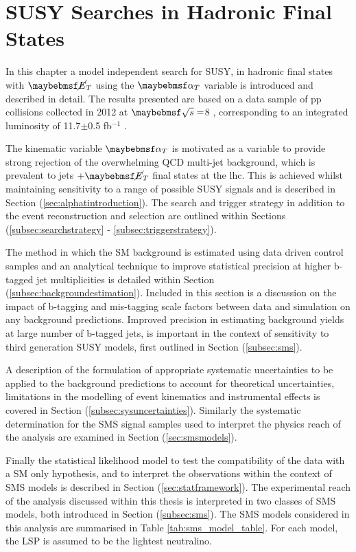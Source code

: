 \chapter{SUSY Searches in Hadronic Final States}
\label{chap:SUSYsearches}

In this chapter a model independent search for \ac{SUSY}, in hadronic final states with $\met$ using the $\alphat$ variable is introduced and described in detail. The results presented are based on a data sample of pp collisions collected in 2012 at $\com =$8 \TeV, corresponding to an integrated luminosity of 11.7$\pm$0.5 fb$^{-1}$ \cite{ra1_epjc}.

The kinematic variable $\alphat$ is motivated as a variable to provide strong rejection of the overwhelming QCD multi-jet background, which is prevalent to jets $+ \met$ final states at the \ac{lhc}. This is achieved whilst maintaining sensitivity to a range of possible \ac{SUSY} signals and is described in Section (\ref{sec:alphatintroduction}). The search and trigger strategy in addition to the event reconstruction and selection are outlined within Sections (\ref{subsec:searchstrategy} - \ref{subsec:triggerstrategy}). 

The method in which the \ac{SM} background is estimated using data driven control samples and an analytical technique to improve statistical precision at higher b-tagged jet multiplicities is detailed within Section (\ref{subsec:backgroundestimation}). Included in this section is a discussion on the impact of b-tagging and mis-tagging scale factors between data and simulation on any background predictions. Improved precision in estimating background yields at large number of b-tagged jets, is important in the context of sensitivity to third generation \ac{SUSY} models, first outlined in Section (\ref{subsec:sms}).

A description of the formulation of appropriate systematic uncertainties to be applied to the background predictions to account for theoretical uncertainties, limitations in the modelling of event kinematics and instrumental effects is covered in Section (\ref{subsec:sysuncertainties}). Similarly the systematic determination for the \ac{SMS} signal samples used to interpret the physics reach of the analysis are examined in Section (\ref{sec:smsmodels}).

Finally the statistical likelihood model to test the compatibility of the data with a \ac{SM} only hypothesis, and to interpret the observations within the context of \ac{SMS} models is described in Section (\ref{sec:statframework}). The experimental reach of the analysis discussed within this thesis is interpreted in two classes of \ac{SMS} models, both introduced in Section (\ref{subsec:sms}). The \ac{SMS} models considered in this analysis are summarised in Table \ref{tab:sms_model_table}. For each model, the \ac{LSP} is assumed to be the lightest neutralino. 

